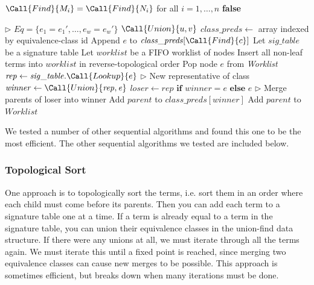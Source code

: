 \begin{algorithm}
\begin{algorithmic}[1]
      \State \Return $\Call{Find}{M_i} = \Call{Find}{N_i}$
      for all $i = 1,\ldots,n$ \Else \State \Return \textbf{false} \EndIf
      \EndFunction

      \State $\rhd$ $\mathit{Eq} = \{e_1 = e_1', \ldots, e_w = e_w'\}$
        \State $\Call{Union}{u, v}$ 
      \EndFor
      \State $\mathit{class\_preds} \gets$ array indexed by equivalence-class id
          \State Append $e$ to $\mathit{class\_preds}[\Call{Find}{c}]$
        \EndFor
      \EndFor
      \State Let $\mathit{sig\_table}$ be a signature table
      \State Let $\mathit{worklist}$ be a FIFO worklist of nodes
      \State Insert all non-leaf terms into $\mathit{worklist}$ in reverse-topological order
        \State Pop node $e$ from \textit{Worklist}
          \State $\mathit{rep} \gets \mathit{sig\_table}.\Call{Lookup}{e}$
          \State $\rhd$ New representative of class
          \State $\mathit{winner} \gets \Call{Union}{\mathit{rep}, \mathit{e}}$
          \State $\mathit{loser} \gets \mathit{rep} \textbf{ if } \mathit{winner} = e \textbf{ else } e$
            \State $\rhd$ Merge parents of loser into winner
            \State Add $\mathit{parent}$ to $\mathit{class\_preds}[\mathit{winner}]$
            \State Add $\mathit{parent}$ to $\mathit{Worklist}$
          \EndFor
        \EndIf
      \EndWhile
    \EndFunction
\end{algorithmic}
\caption{Sequential worklist congruence closure algorithm}
\label{alg:seq}
\end{algorithm}

We tested a number of other sequential algorithms and found this one to be the
most efficient. The other sequential algorithms we tested are included below.

\subsubsection{Topological Sort} One approach is to topologically sort the
terms, i.e. sort them in an order where each child must come before its parents.
Then you can add each term to a signature table one at a time. If a term is
already equal to a term in the signature table, you can union their equivalence
classes in the union-find data structure. If there were any unions at all, we
must iterate through all the terms again. We must iterate this until a fixed
point is reached, since merging two equivalence classes can cause new merges to
be possible. This
approach is sometimes efficient, but breaks down when many iterations must be
done.

